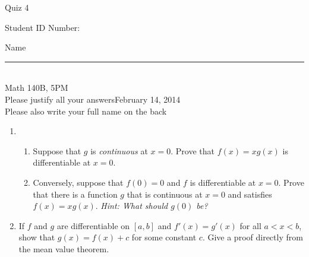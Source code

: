\documentclass[12pt]{article}
\begin{document}
\begin{flushleft} 
\centerline{\LARGE{Quiz 4}} 
\vspace{5 mm}
{Student ID Number:}\hfill  
{Name \rule {2 in}{0.01in}}\\
Math 140B, 5PM
\\
{Please justify all your answers}\hfill {February 14, 2014}
\\
{Please also write your full name on the back} 

\medskip
\end{flushleft}

\begin{enumerate}
	\item \begin{enumerate}
		\item Suppose that $g$ is \textit{continuous} at $x = 0$. Prove that $f(x) = xg(x)$ is differentiable at $x=0$.
		\vfill
		\item Conversely, suppose that $f(0) = 0$ and $f$ is differentiable at $x=0$. Prove that there is a function $g$ that is continuous at $x=0$ and satisfies $f(x) = xg(x)$. \textit{Hint: What should $g(0)$ be?}
	\end{enumerate}
	\vfill
	\item If $f$ and $g$ are differentiable on $[a,b]$ and $f'(x) = g'(x)$ for all $a<x<b$, show that $g(x) = f(x)+c$ for some constant $c$. Give a proof directly from the mean value theorem.
	\vfill
\end{enumerate}

\end{document}
